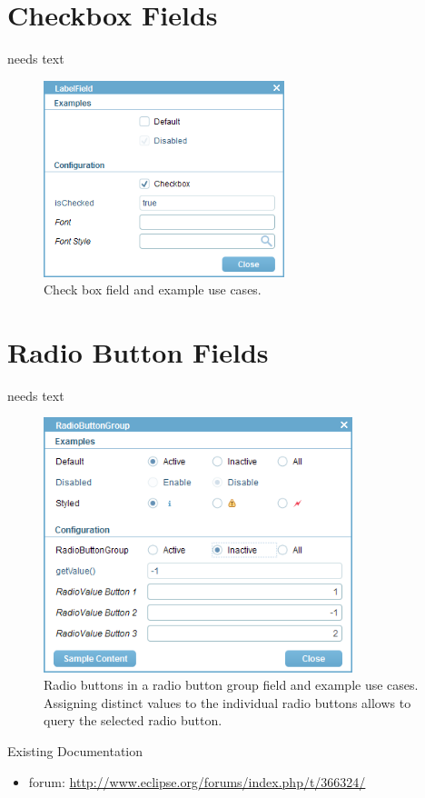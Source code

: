 \documentclass[a4paper,10pt,twoside]{book}
\begin{document}
\section{Checkbox Fields}
needs text

\begin{figure}
\includegraphics[width=7cm]{checkboxfield.png}
\caption{Check box field and example use cases.
}
\end{figure}


\section{Radio Button Fields}
needs text

\begin{figure}
\includegraphics[width=9cm]{radiobuttonfield.png}
\caption{Radio buttons in a radio button group field and example use cases.
Assigning distinct values to the individual radio buttons allows to query the selected radio button.}
\end{figure}

\noindent Existing Documentation
\begin{itemize}
  \item forum: \url{http://www.eclipse.org/forums/index.php/t/366324/}
\end{itemize}
\end{document}
